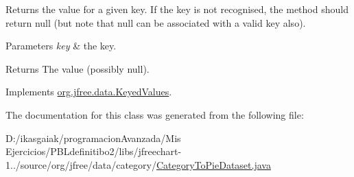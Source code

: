 Returns the value for a given key. If the key is not recognised, the method should return {\ttfamily null} (but note that {\ttfamily null} can be associated with a valid key also).


\begin{DoxyParams}{Parameters}
{\em key} & the key.\\
\hline
\end{DoxyParams}
\begin{DoxyReturn}{Returns}
The value (possibly {\ttfamily null}). 
\end{DoxyReturn}


Implements \mbox{\hyperlink{interfaceorg_1_1jfree_1_1data_1_1_keyed_values_aa6bb7fe3ff33503d7f31b9be505c3a70}{org.\+jfree.\+data.\+Keyed\+Values}}.



The documentation for this class was generated from the following file\+:\begin{DoxyCompactItemize}
\item 
D\+:/ikasgaiak/programacion\+Avanzada/\+Mis Ejercicios/\+P\+B\+Ldefinitibo2/libs/jfreechart-\/1../source/org/jfree/data/category/\mbox{\hyperlink{_category_to_pie_dataset_8java}{Category\+To\+Pie\+Dataset.\+java}}\end{DoxyCompactItemize}

